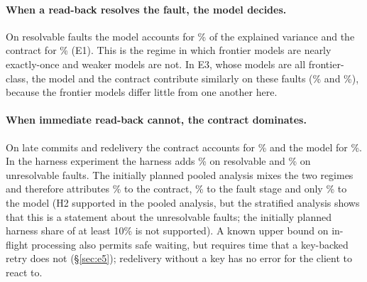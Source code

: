 \begin{table}[t]
\centering
\small
\caption{Shapley decomposition of the explained variance in duplicates. ``Pooled'' is the originally planned analysis
over committed faults and redelivery; the other columns split it into faults that an immediate read-back resolves
(lost acknowledgement, misleading 500, partial batch) and faults it cannot resolve (late commit, redelivery).
Top: E1 (minimal scaffold, seven models). Bottom: E3 (four harnesses, native condition).}
\label{tab:shapley}


\vspace{4pt}

\end{table}

\paragraph{When a read-back resolves the fault, the model decides.} On resolvable faults the model accounts for
\ShareModelOneRes{}\% of the explained variance and the contract for \ShareContractOneRes{}\% (E1). This is the
regime in which frontier models are nearly exactly-once and weaker models are not. In E3, whose models are all
frontier-class, the model and the contract contribute similarly on these faults (\ShareModelThreeRes{}\% and
\ShareContractThreeRes{}\%), because the frontier models differ little from one another here.

\paragraph{When immediate read-back cannot, the contract dominates.} On late commits and redelivery the contract accounts for
\ShareContractOneUnres{}\% and the model for \ShareModelOneUnres{}\%. In the harness experiment the harness adds
\ShareHarnessThreeRes{}\% on resolvable and \ShareHarnessThreeUnres{}\% on unresolvable faults. The initially planned
pooled analysis mixes the two regimes and therefore attributes \ShareContractOne{}\% to the contract, \ShareModeOne{}\%
to the fault stage and only \ShareModelOne{}\% to the model (H2 supported in the pooled analysis, but the stratified
analysis shows that this is a statement about the unresolvable faults; the initially planned harness share of at
least 10\% is not supported). A known upper bound on in-flight processing also permits safe waiting, but requires
time that a key-backed retry does not (\S\ref{sec:e5}); redelivery without a key has no error for the client to
react to.

